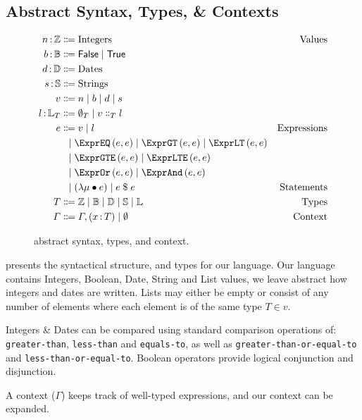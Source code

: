 \subsection{Abstract Syntax, Types, \& Contexts}
\label{subsec:defs}

\begin{figure}[ht]
  \centering
\begin{align*}
  \ty{n}{\mathbb{Z}}
  &
    \Coloneqq
    \text{Integers}
  & \text{Values}
  \\
  \ty{b}{\mathbb{B}}
  & \Coloneqq
    \mathsf{False}\alt\mathsf{True}
  \\
  \ty{d}{\mathbb{D}}
  & \Coloneqq
    \text{Dates}
  \\
  \ty{s}{\mathbb{S}}
  & \Coloneqq
    \text{Strings}
  \\
  v
  &
    \Coloneqq
    n
    \alt
    b
    \alt
    d
    \alt
    s
  \\
  \ty{l}{\mathbb{L}_T}
  & \Coloneqq
    \emptyset_T\alt{}v\Cons_T{}l
  \\
  e
  &
    \Coloneqq
    v
    \alt
    l
  & \text{Expressions}
  \\
  &
    \firstAlt
    \exprEQ{e}{e}
    \alt
    \exprGT{e}{e}
    \alt
    \exprLT{e}{e}
  \\
  & \firstAlt
    \exprGTE{e}{e}
    \alt
    \exprLTE{e}{e}
  &
  \\
  & \firstAlt
    \exprOr{e}{e}
    \alt
    \exprAnd{e}{e}
  &
  \\
  &
    \firstAlt
    \left( \lambda \mu \bullet e \right)
    \alt
    e \; \$ \; e
  &
    \text{Statements}
  \\
  T
  &
    \Coloneqq
    \mathbb{Z}
    \alt
    \mathbb{B}
    \alt
    \mathbb{D}
    \alt
    \mathbb{S}
    \alt
    \mathbb{L}
  &
    \text{Types}
  \\
  \Gamma
  &
    \Coloneqq
    \envAdd{(\ty{x}{T})}
    \alt
    \emptyset
    &
      \text{Context}
\end{align*}
  \caption{\label{fig:syntax}\thePolicyLang abstract syntax, types, and context.}
\end{figure}

 presents the syntactical structure, and types for our language.
Our language contains Integers, Boolean, Date, String and List values, we leave abstract how integers and dates are written. Lists may either be empty or consist of any number of elements where each element is of the same type $T \in v$.

Integers \& Dates can be compared using standard comparison operations of: \texttt{greater-than}, \texttt{less-than} and \texttt{equals-to}, as well as \texttt{greater-than-or-equal-to} and \texttt{less-than-or-equal-to}.
Boolean operators provide logical conjunction and disjunction.

A context ($\Gamma$) keeps track of well-typed expressions, and our context can be expanded.
